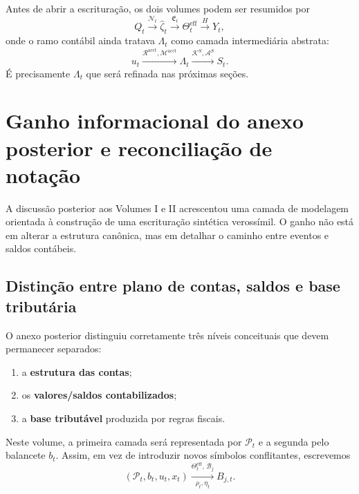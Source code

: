 \documentclass[11pt,a4paper]{article}
\newcommand{\cB}{\mathcal{B}}
\newcommand{\cA}{\mathcal{A}}
\newcommand{\cN}{\mathcal{N}}
\newcommand{\Plano}{\mathcal{P}}
\begin{document}
Antes de abrir a escrituração, os dois volumes podem ser resumidos por
\[
\boxed{
Q_t
\xrightarrow{\cN_t}
\widehat\zeta_t
\xrightarrow{\mathfrak E_t}
\Theta_t^{\mathrm{eff}}
\xrightarrow{H}
Y_t,
}
\]
onde o ramo contábil ainda tratava $\Lambda_t$ como camada intermediária abstrata:
\begin{equation}
\boxed{
u_t
\xrightarrow{\mathcal R^{\mathrm{acct}},\mathcal M^{\mathrm{acct}}}
\Lambda_t
\xrightarrow{\mathcal K^S,\cA^S}
S_t.}
\label{eq:lambda-old}
\end{equation}
É precisamente $\Lambda_t$ que será refinada nas próximas seções.

\section{Ganho informacional do anexo posterior e reconciliação de notação}

A discussão posterior aos Volumes I e II acrescentou uma camada de modelagem orientada à construção de uma escrituração sintética verossímil. O ganho não está em alterar a estrutura canônica, mas em detalhar o caminho entre eventos e saldos contábeis.

\subsection{Distinção entre plano de contas, saldos e base tributária}

O anexo posterior distinguiu corretamente três níveis conceituais que devem permanecer separados:
\begin{enumerate}
    \item a \textbf{estrutura das contas};
    \item os \textbf{valores/saldos contabilizados};
    \item a \textbf{base tributável} produzida por regras fiscais.
\end{enumerate}

Neste volume, a primeira camada será representada por $\Plano_t$ e a segunda pelo balancete $b_t$. Assim, em vez de introduzir novos símbolos conflitantes, escrevemos
\begin{equation}
\boxed{
(\Plano_t,b_t,u_t,x_t)
\xrightarrow[\rho_t,\eta_t]{\Theta_t^{\mathrm{eff}},\,\cB_j}
B_{j,t}.
}
\label{eq:plan-bal-tax}
\end{equation}
\end{document}
